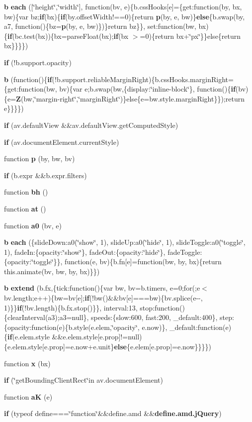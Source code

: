 \begin{DoxyCompactItemize}
\item 
{\bf b} {\bf each} ([\char`\"{}height\char`\"{},\char`\"{}width\char`\"{}], function(bv, e)\{b.\-css\-Hooks[e]=\{get\-:function(by, bx, bw)\{var bz;{\bf if}(bx)\{{\bf if}(by.\-offset\-Width!==0)\{return {\bf p}(by, e, bw)\}{\bf else}\{b.\-swap(by, a7, function()\{bz={\bf p}(by, e, bw)\})\}return bz\}\}, set\-:function(bw, bx)\{{\bf if}(bc.\-test(bx))\{bx=parse\-Float(bx);{\bf if}(bx $>$=0)\{return bx+\char`\"{}px\char`\"{}\}\}else\{return bx\}\}\}\})
\item 
{\bf if} (!b.\-support.\-opacity)
\item 
{\bf b} (function()\{{\bf if}(!b.\-support.\-reliable\-Margin\-Right)\{b.\-css\-Hooks.\-margin\-Right=\{get\-:function(bw, bv)\{var e;b.\-swap(bw,\{display\-:\char`\"{}inline-\/block\char`\"{}\}, function()\{{\bf if}(bv)\{e={\bf Z}(bw,\char`\"{}margin-\/right\char`\"{},\char`\"{}margin\-Right\char`\"{})\}else\{e=bw.\-style.\-margin\-Right\}\});return e\}\}\}\})
\item 
{\bf if} (av.\-default\-View \&\&av.\-default\-View.\-get\-Computed\-Style)
\item 
{\bf if} (av.\-document\-Element.\-current\-Style)
\item 
function {\bf p} (by, bw, bv)
\item 
{\bf if} (b.\-expr \&\&b.\-expr.\-filters)
\item 
function {\bf bh} ()
\item 
function {\bf at} ()
\item 
function {\bf a0} (bv, e)
\item 
{\bf b} {\bf each} (\{slide\-Down\-:a0(\char`\"{}show\char`\"{}, 1), slide\-Up\-:a0(\char`\"{}hide\char`\"{}, 1), slide\-Toggle\-:a0(\char`\"{}toggle\char`\"{}, 1), fade\-In\-:\{opacity\-:\char`\"{}show\char`\"{}\}, fade\-Out\-:\{opacity\-:\char`\"{}hide\char`\"{}\}, fade\-Toggle\-:\{opacity\-:\char`\"{}toggle\char`\"{}\}\}, function(e, bv)\{b.\-fn[e]=function(bw, by, bx)\{return this.\-animate(bv, bw, by, bx)\}\})
\item 
{\bf b} {\bf extend} (b.\-fx,\{tick\-:function()\{var bw, bv=b.\-timers, e=0;for(;e$<$ bv.\-length;e++)\{bw=bv[e];{\bf if}(!bw()\&\&bv[e]===bw)\{bv.\-splice(e-\/-\/, 1)\}\}{\bf if}(!bv.\-length)\{b.\-fx.\-stop()\}\}, interval\-:13, stop\-:function()\{clear\-Interval(a3);a3=null\}, speeds\-:\{slow\-:600, fast\-:200, \-\_\-default\-:400\}, step\-:\{opacity\-:function(e)\{b.\-style(e.\-elem,\char`\"{}opacity\char`\"{}, e.\-now)\}, \-\_\-default\-:function(e)\{{\bf if}(e.\-elem.\-style \&\&e.\-elem.\-style[e.\-prop]!=null)\{e.\-elem.\-style[e.\-prop]=e.\-now+e.\-unit\}{\bf else}\{e.\-elem[e.\-prop]=e.\-now\}\}\}\})
\item 
function {\bf x} (bx)
\item 
{\bf if} (\char`\"{}get\-Bounding\-Client\-Rect\char`\"{}in av.\-document\-Element)
\item 
function {\bf a\-K} (e)
\item 
{\bf if} (typeof define===\char`\"{}function\char`\"{}\&\&define.\-amd \&\&{\bf define.\-amd.\-j\-Query})
\end{DoxyCompactItemize}
